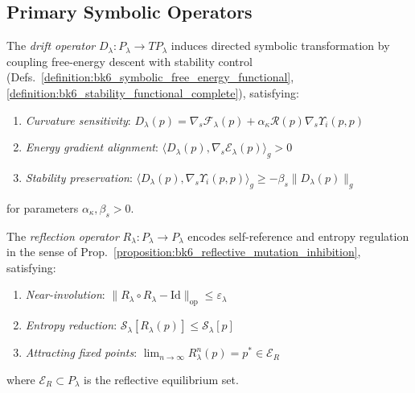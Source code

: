 \subsection{Primary Symbolic Operators}
\label{subsec:bk6_primary_symbolic_operators_complete}

\begin{definition}
\label{definition:bk6_drift_operator_complete}
The \emph{drift operator} $D_\lambda : P_{\lambda} \to T P_{\lambda}$ induces directed symbolic transformation by coupling free-energy descent with stability control (Defs.~\ref{definition:bk6_symbolic_free_energy_functional}, \ref{definition:bk6_stability_functional_complete}), satisfying:
\begin{enumerate}
\item \emph{Curvature sensitivity}: $D_\lambda(p) = \nabla_s\mathcal{F}_{\lambda}(p) + \alpha_\kappa \mathcal{R}(p) \nabla_s \Upsilon_i(p,p)$
\item \emph{Energy gradient alignment}: $\langle D_\lambda(p), \nabla_s \mathcal{E}_\lambda(p) \rangle_g > 0$
\item \emph{Stability preservation}: $\langle D_\lambda(p), \nabla_s \Upsilon_i(p,p) \rangle_g \geq -\beta_s \|D_\lambda(p)\|_g$
\end{enumerate}
for parameters $\alpha_\kappa, \beta_s > 0$.
\end{definition}

\begin{definition}
\label{definition:bk6_reflection_operator_complete}
The \emph{reflection operator} $R_\lambda : P_{\lambda} \to P_{\lambda}$ encodes self-reference and entropy regulation in the sense of Prop.~\ref{proposition:bk6_reflective_mutation_inhibition}, satisfying:
\begin{enumerate}
\item \emph{Near-involution}: $\|R_\lambda \circ R_\lambda - \text{Id}\|_{\text{op}} \leq \varepsilon_\lambda$
\item \emph{Entropy reduction}: $\mathcal{S}_\lambda[R_\lambda(p)] \leq \mathcal{S}_\lambda[p]$
\item \emph{Attracting fixed points}: $\lim_{n \to \infty} R_\lambda^n(p) = p^* \in \mathcal{E}_R$
\end{enumerate}
where $\mathcal{E}_R \subset P_\lambda$ is the reflective equilibrium set.
\end{definition}

